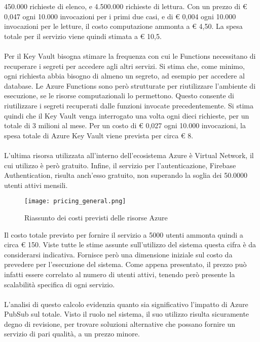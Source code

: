 450.000 richieste di elenco,
e 4.500.000 richieste di lettura.
Con un prezzo di € 0,047 ogni 10.000 invocazioni per i primi due casi,
e di € 0,004 ogni 10.000 invocazioni per le letture,
il costo computazione ammonta a € 4,50.
La spesa totale per il servizio viene quindi stimata a € 10,5.\\
\\
Per il Key Vault bisogna stimare la frequenza 
con cui le Functions necessitano di recuperare i segreti per accedere agli altri servizi.
Si stima che, come minimo, ogni richiesta abbia bisogno di almeno un segreto,
ad esempio per accedere al database.
Le Azure Functions sono però strutturate per riutilizzare 
l'ambiente di esecuzione, se le risorse computazionali lo permettono.
Questo consente di riutilizzare i segreti recuperati dalle funzioni invocate precedentemente.
Si stima quindi che il Key Vault venga interrogato una volta ogni dieci richieste,
per un totale di 3 milioni al mese.
Per un costo di € 0,027 ogni 10.000 invocazioni,
la spesa totale di Azure Key Vault viene prevista per circa € 8.\\
\\
L'ultima risorsa utilizzata all'interno dell'ecosistema Azure è Virtual Network, 
il cui utilizzo è però gratuito.
Infine, il servizio per l'autenticazione, Firebase Authentication,
risulta anch'esso gratuito, non superando la soglia dei 50.0000 utenti attivi mensili.
\clearpage
\begin{figure}[htbp]
    \begin{center}
        \texttt{[image: pricing\_general.png]}
        \caption{Riassunto dei costi previsti delle risorse Azure}
    \end{center}
\end{figure}
Il costo totale previsto per fornire il servizio a 5000 utenti ammonta quindi a circa € 150.
Viste tutte le stime assunte sull'utilizzo del sistema 
questa cifra è da considerarsi indicativa.
Fornisce però una dimensione iniziale sul costo da prevedere per l'esecuzione del sistema.
Come appena presentato, il prezzo può infatti essere correlato al numero di utenti attivi, 
tenendo però presente la scalabilità specifica di ogni servizio.\\
\\
L'analisi di questo calcolo evidenzia quanto sia significativo
l'impatto di Azure PubSub sul totale. 
Visto il ruolo nel sistema, 
il suo utilizzo risulta sicuramente degno di revisione,
per trovare soluzioni alternative che possano fornire 
un servizio di pari qualità, a un prezzo minore.

\clearpage